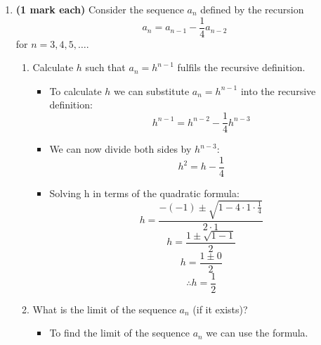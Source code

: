 \documentclass[12pt]{report}
\begin{document}
\begin{enumerate}[leftmargin=\labelsep]
\newpage

    \item {\bf (1 mark each)} Consider the sequence $a_n$ defined by the recursion
        \begin{equation}
            a_n=a_{n-1}-\frac{1}{4}a_{n-2}
        \end{equation} for $n=3,4,5,\dots$.
        \begin{enumerate}
            \item Calculate $h$ such that $a_n=h^{n-1}$ fulfils the recursive definition.
                \begin{tcolorbox}
                    \begin{itemize}[label={}]
                        \item To calculate $h$ we can substitute $a_n=h^{n-1}$ into the recursive definition:
                        \begin{equation*}
                            h^{n-1}=h^{n-2}-\frac{1}{4}h^{n-3}
                        \end{equation*}
                        \item We can now divide both sides by $h^{n-3}$:
                        \begin{equation*}
                            h^2=h- \frac{1}{4}
                        \end{equation*}
                        \item Solving h in terms of the quadratic formula:
                        \begin{equation*}
                            h=\frac{-(-1) \pm \sqrt{1-4 \cdot 1 \cdot \frac{1}{4}}}{2 \cdot 1}
                        \end{equation*}
                        \begin{equation*}
                            h=\frac{1 \pm \sqrt{1-1}}{2}
                        \end{equation*}
                        \begin{equation*}
                            h=\frac{1 \pm 0}{2}
                        \end{equation*}
                        \begin{equation*}
                            \therefore h=\frac{1}{2}
                        \end{equation*}
                    \end{itemize}
                \end{tcolorbox}
            \item What is the limit of the sequence $a_n$ (if it exists)?
                \begin{tcolorbox}
                    \begin{itemize}[label={}]
                        \item To find the limit of the sequence $a_n$ we can use the formula.
                    \end{itemize}
                \end{tcolorbox}
        \end{enumerate}


\end{enumerate}
\end{document}
